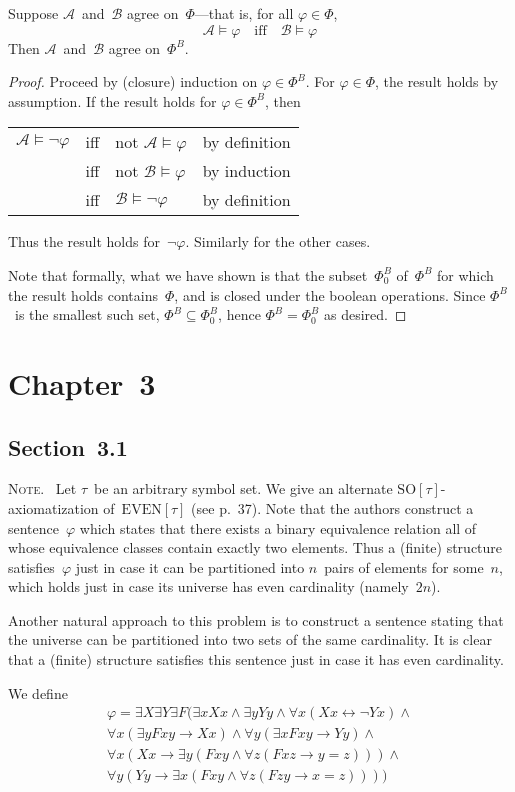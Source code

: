 \documentclass[letterpaper]{article}
\newcommand{\A}{\mathcal{A}}
\newcommand{\B}{\mathcal{B}}
\newcommand{\so}{\mathrm{SO}}
\newcommand{\even}{\mathrm{EVEN}}
\newcommand{\limp}{\rightarrow}
\newcommand{\liff}{\leftrightarrow}
\newcommand{\bookchapter}[1]{\section*{Chapter~{#1}}}
\newcommand{\booksection}[1]{\subsection*{Section~{#1}}}
\newcommand{\note}{\noindent\textsc{Note.}\ }
\theoremstyle{plain}
\begin{document}
Suppose $\A$~and~$\B$ agree on~$\Phi$---that is, for all $\varphi\in\Phi$,
$$\A\models\varphi\quad\text{iff}\quad\B\models\varphi$$
Then $\A$~and~$\B$ agree on~$\Phi^B$.
\begin{proof}
Proceed by (closure) induction on $\varphi\in\Phi^B$. For $\varphi\in\Phi$, the result holds by assumption. If the result holds for $\varphi\in\Phi^B$, then
\begin{center}
\begin{tabular}{rcll}
$\A\models\lnot\varphi$&iff&not $\A\models\varphi$&by definition\\
	&iff&not $\B\models\varphi$&by induction\\
	&iff&$\B\models\lnot\varphi$&by definition
\end{tabular}
\end{center}
Thus the result holds for~$\lnot\varphi$. Similarly for the other cases.

Note that formally, what we have shown is that the subset~$\Phi_0^B$ of~$\Phi^B$ for which the result holds contains~$\Phi$, and is closed under the boolean operations. Since $\Phi^B$~is the smallest such set, $\Phi^B\subseteq\Phi_0^B$, hence $\Phi^B=\Phi_0^B$ as desired.
\end{proof}

\bookchapter{3}
\booksection{3.1}
\note
Let $\tau$~be an arbitrary symbol set. We give an alternate $\so[\tau]$-axiomatization of~$\even[\tau]$ (see p.~37). Note that the authors construct a sentence~$\varphi$ which states that there exists a binary equivalence relation all of whose equivalence classes contain exactly two elements. Thus a (finite) structure satisfies~$\varphi$ just in case it can be partitioned into $n$~pairs of elements for some~$n$, which holds just in case its universe has even cardinality (namely~$2n$).

Another natural approach to this problem is to construct a sentence stating that the universe can be partitioned into two sets of the same cardinality. It is clear that a (finite) structure satisfies this sentence just in case it has even cardinality.

We define
\begin{multline*}
\varphi=\exists X\exists Y\exists F(\exists x Xx\land\exists y Yy\land\forall x(Xx\liff\lnot Yx)\land\\
	\forall x(\exists y Fxy\limp Xx)\land\forall y(\exists x Fxy\limp Yy)\land\\
	\forall x(Xx\limp\exists y(Fxy\land\forall z(Fxz\limp y=z)))\land\\
	\forall y(Yy\limp\exists x(Fxy\land\forall z(Fzy\limp x=z))))
\end{multline*}
\end{document}
